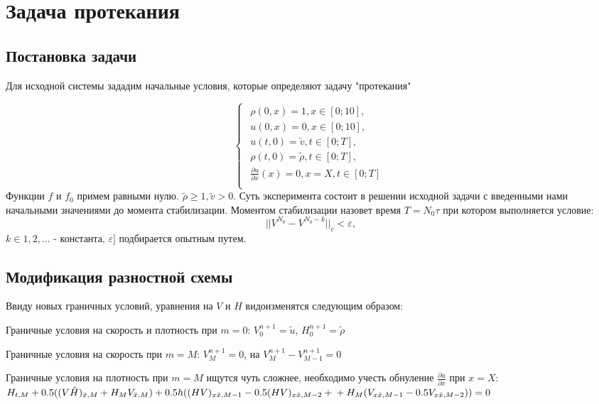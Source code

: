 \section{Задача протекания}
\subsection{Постановка задачи}

Для исходной системы зададим начальные условия, которые определяют задачу "протекания"

\begin{equation}
	\begin{cases}
		\begin{array}{l}
			\rho(0, x) = 1, x \in [0;10],\\
			u(0, x) = 0, x \in [0;10],\\
			u(t, 0) = \tilde{v}, t \in [0;T],\\
			\rho(t, 0) = \tilde{\rho}, t \in [0;T],\\			
			\frac{\partial u}{\partial x}(x) = 0, x=X, t \in [0;T]\\
		\end{array}
	\end{cases}
\end{equation}
Функции $f$ и $f_0$ примем равными нулю. $\tilde{\rho} \geqslant 1, \tilde{v} > 0 $. Суть эксперимента состоит в решении исходной задачи с введенными нами начальными значениями до момента стабилизации. Моментом стабилизации назовет время $T = N_0\tau$ при котором выполняется условие:
$$
||V^{N_0} - V^{N_0 - k}||_c < \varepsilon,
$$
$k \in 1,2,\dots$ - константа, $\varepsilon]$ подбирается опытным путем.

\subsection{Модификация разностной схемы}
Ввиду новых граничных условий, уравнения на $V$ и $H$ видоизменятся следующим образом:

Граничные условия на скорость и плотность при $m=0$:
$V_0^{n+1} = \tilde{u}$, $H_0^{n+1} = \tilde{\rho}$

Граничные условия на скорость при $m=M$:
$V_M^{n+1} = 0$, на $V_M^{n+1} - V_{M-1}^{n+1} = 0$

Граничные условия на плотность при $m=M$ ищутся чуть сложнее, необходимо учесть обнуление $\frac{\partial u}{\partial x}$ при $x=X$:\\

$
H_{t,M} + 0.5((V\hat{H})_{\bar{x},M} + H_MV_{\bar{x},M}) + 0.5h((HV)_{x\bar{x},M-1} - 0.5(HV)_{x\bar{x},M-2} + \\
+ H_M(V_{x\bar{x},M-1} - 0.5 V_{x\bar{x},M-2})) = 0
$\\

